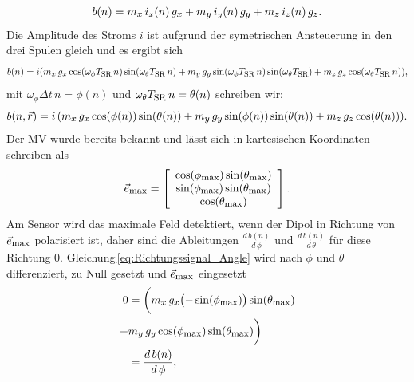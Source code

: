 \begin{equation}
    b(n) =   m_{\textrm{\footnotesize{$x$}}}\,i_x(n) \,g_{\textrm{\footnotesize{$x$}}}  + m_{\textrm{\footnotesize{$y$}}}\,i_y(n)\,g_{\textrm{\footnotesize{$y$}}}  + m_{\textrm{\footnotesize{$z$}}}\,i_z(n)\,g_{\textrm{\footnotesize{$z$}}}.
\end{equation}
Die Amplitude des Stroms $i$ ist aufgrund der symetrischen Ansteuerung in den drei Spulen gleich und es ergibt sich 
\begin{equation}
     b(n) =  i ( m_{\textrm{\footnotesize{$x$}}}\,g_{\textrm{\footnotesize{$x$}}} \cos(\omega_\phi T_{\textrm{\footnotesize{SR}}}\,n) \sin(\omega_\theta T_{\textrm{\footnotesize{SR}}}\,n) + m_{\textrm{\footnotesize{$y$}}}\,g_{\textrm{\footnotesize{$y$}}} \sin(\omega_\phi T_{\textrm{\footnotesize{SR}}}\,n)\sin(\omega_\theta T_{\textrm{\footnotesize{SR}}}) + m_{\textrm{\footnotesize{$z$}}}\,g_{\textrm{\footnotesize{$z$}}} \cos(\omega_\theta T_{\textrm{\footnotesize{SR}}}\,n)),
    \label{eq:Richtungssignal}
\end{equation}
mit $\omega_\phi \Delta t\,n = \phi(n)$ und $\omega_\theta T_{\textrm{\footnotesize{SR}}}\,n = \theta(n)$ schreiben wir:
\begin{equation}
     b(n,\vec{r}) = i\,( m_{\textrm{\footnotesize{$x$}}}\,g_{\textrm{\footnotesize{$x$}}} \cos(\phi(n) ) \sin(\theta(n) ) + m_{\textrm{\footnotesize{$y$}}}\,g_{\textrm{\footnotesize{$y$}}} \sin(\phi(n))\sin(\theta(n)) + m_{\textrm{\footnotesize{$z$}}}\,g_{\textrm{\footnotesize{$z$}}} \cos(\theta(n))).
     \label{eq:Richtungssignal_Angle}
\end{equation}
Der MV wurde bereits bekannt und lässt sich in  kartesischen Koordinaten schreiben als
\begin{equation}
                \vec{e}_{\textrm{\footnotesize{max}}} =  \left[\begin{array}{c} \cos(\phi_{\textrm{\footnotesize{max}}}) \sin(\theta _{\textrm{\footnotesize{max}}})\\ \sin(\phi_{\textrm{\footnotesize{max}}})\sin(\theta_{\textrm{\footnotesize{max}}})\\ \cos(\theta_{\textrm{\footnotesize{max}}}) \end{array}\right].
    \label{eq:VekMVKart}
\end{equation}
Am Sensor wird das maximale Feld detektiert, wenn der Dipol in Richtung von $\vec{e}_{\textrm{\footnotesize{max}}}$ polarisiert ist, daher sind die Ableitungen $\frac{d\,b(n)}{d\, \phi }$ und $\frac{d\,b(n)}{d\, \theta }$ für diese Richtung 0. Gleichung\,\ref{eq:Richtungssignal_Angle} wird nach $\phi$ und $\theta$ differenziert, zu Null gesetzt und $\vec{e}_{\textrm{\footnotesize{max}}}$ eingesetzt
\begin{equation}
    \begin{split}
    0 &=  \biggl( m_{\textrm{\footnotesize{$x$}}}\,g_{\textrm{\footnotesize{$x$}}} \bigl(-\sin(\phi_{\textrm{\footnotesize{max}}} )\bigr) \sin(\theta_{\textrm{\footnotesize{max}}} ) \\+ &m_{\textrm{\footnotesize{$y$}}}\,g_{\textrm{\footnotesize{$y$}}} \cos(\phi_{\textrm{\footnotesize{max}}})\sin(\theta_{\textrm{\footnotesize{max}}})\biggr)\\ &= \frac{d\,b(n)}{d\, \phi } ,
    \label{eq:diffPhi}
    \end{split}
\end{equation}
